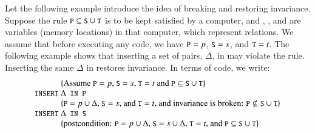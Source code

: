 \documentclass{elsarticle}
\begin{document}
	Let the following example introduce the idea of breaking and restoring invariance.
	Suppose the rule $\text{\tt\small P}\subseteq\text{\tt\small S}\cup\text{\tt\small T}$ is to be kept satisfied by a computer,
	and , , and  are variables (memory locations) in that computer,
	which represent relations.
	We assume that before executing any code, we have $\text{\tt\small P}=p$, $\text{\tt\small S}=s$, and $\text{\tt\small T}=t$.
	The following example shows that inserting a set of pairs, $\Delta$, in 
	may violate the rule.
	Inserting the same $\Delta$ in  restores invariance.
	In terms of code, we write:
\[\begin{array}{r@{~}l}
&\{\text{Assume $\code{P}=p$, $\code{S}=s$, $\code{T}=t$ and $\code{P}\subs\code{S}\cup\code{T}$}\}\\
\code{INSERT}&\Delta\code{ IN P}\\
&\{\text{$\code{P}=p\cup\Delta$, $\code{S}=s$, and $\code{T}=t$, and invariance is broken: $\code{P}\not\subs\code{S}\cup\code{T}$}\}\\
\code{INSERT}&\Delta\code{ IN S}\\
&\{\text{postcondition: $\code{P}=p\cup\Delta$, $\code{S}=s\cup\Delta$, $\code{T}=t$, and $\code{P}\subs\code{S}\cup\code{T}$}\}\\
\end{array}\]
	
\end{document}
